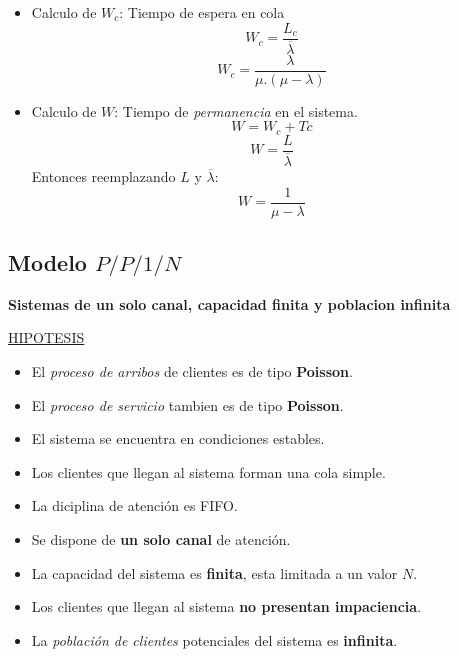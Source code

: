 \documentclass{article}
\begin{document}
\begin{itemize}
    \item Calculo de \(W_c\): Tiempo de espera en cola
        \begin{equation}
            W_c = \frac{L_c}{\overline{\lambda}}
        \end{equation}  
        \begin{equation} \label{eu_eqn}
            W_c = \frac{\lambda}{\mu.(\mu-\lambda)}
        \end{equation}  
    \item Calculo de \(W\): Tiempo de \textit{permanencia} en el sistema.
        \begin{equation} \label{eu_eqn}
            W = W_c+Tc 
        \end{equation}  
        \begin{equation} \label{eu_eqn}
            W = \frac{L}{\overline{\lambda}} 
        \end{equation}
        Entonces reemplazando \(L\) y \(\overline{\lambda}\):  
        \begin{equation} \label{eu_eqn}
            W = \frac{1}{\mu - \lambda} 
        \end{equation}  
        
\end{itemize}

\newpage
\subsection{Modelo \(P/P/1/N\)}
\textbf{Sistemas de un solo canal, capacidad finita y poblacion infinita}

\noindent
\underline{HIPOTESIS}
\begin{itemize}
    \item El \textit{proceso de arribos} de clientes es de tipo \textbf{Poisson}.
    \item El \textit{proceso de servicio} tambien es de tipo \textbf{Poisson}.
    \item El sistema se encuentra en condiciones estables.
    \item Los clientes que llegan al sistema forman una cola simple.
    \item La diciplina de atención es FIFO.
    \item Se dispone de \textbf{un solo canal} de atención.
    \item La capacidad del sistema es \textbf{finita}, esta limitada a un valor \(N\).
    \item Los clientes que llegan al sistema \textbf{no presentan impaciencia}.
    \item La \textit{población de clientes} potenciales del sistema es \textbf{infinita}.
\end{itemize}
\end{document}
